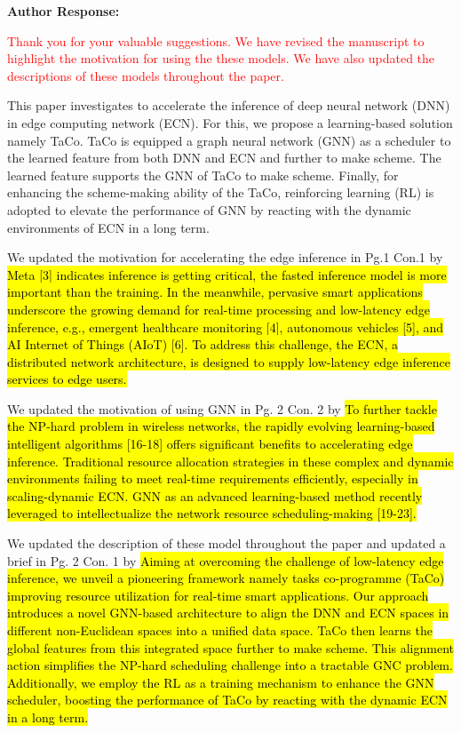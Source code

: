 \documentclass{ar2rc}
\newcommand{\highlight}[1]{\sethlcolor{yellow!50}\hl{#1}}
\begin{document}
\textbf{Author Response:}

\textcolor{red}{Thank you for your valuable suggestions. We have revised the manuscript to highlight the motivation for using the these models. We have also updated the descriptions of these models throughout the paper.}



This paper investigates to accelerate the inference of deep neural network (DNN) in edge computing network (ECN). For this, we propose a learning-based solution namely TaCo. TaCo is equipped a graph neural network (GNN) as a scheduler to the learned feature from both DNN and ECN and further to make scheme. The learned feature supports the GNN of TaCo to make scheme. Finally, for enhancing the scheme-making ability of the TaCo, reinforcing learning (RL) is adopted to elevate the performance of GNN by reacting with the dynamic environments of ECN in a long term.

We updated the motivation for accelerating the edge inference in Pg.1 Con.1 by \highlight{Meta [3] indicates inference is getting critical, the fasted inference model is more important than the training. In the meanwhile, pervasive smart applications underscore the growing demand for real-time processing and low-latency edge inference, e.g., emergent healthcare monitoring [4], autonomous vehicles [5], and AI Internet of Things (AIoT) [6]. To address this challenge, the ECN, a distributed network architecture, is designed to supply low-latency edge inference services to edge users.}

We updated the motivation of using GNN in Pg. 2 Con. 2 by \highlight{To further tackle the NP-hard problem in wireless networks, the rapidly evolving learning-based intelligent algorithms [16-18] offers significant benefits to accelerating edge inference. Traditional resource allocation strategies in these complex and dynamic environments failing to meet real-time requirements efficiently, especially in scaling-dynamic ECN. GNN as an advanced learning-based method recently leveraged to intellectualize the network resource scheduling-making [19-23].}

We updated the description of these model throughout the paper and updated a brief in Pg. 2 Con. 1 by \highlight{Aiming at overcoming the challenge of low-latency edge inference, we unveil a pioneering framework namely tasks co-programme (TaCo) improving resource utilization for real-time smart applications. Our approach introduces a novel GNN-based architecture to align the DNN and ECN spaces in different non-Euclidean spaces into a unified data space. TaCo then learns the global features from this integrated space further to make scheme. This alignment action simplifies the NP-hard scheduling challenge into a tractable GNC problem. Additionally, we employ the RL as a training mechanism to enhance the GNN scheduler, boosting the performance of TaCo by reacting with the dynamic ECN in a long term.}
\end{document}
